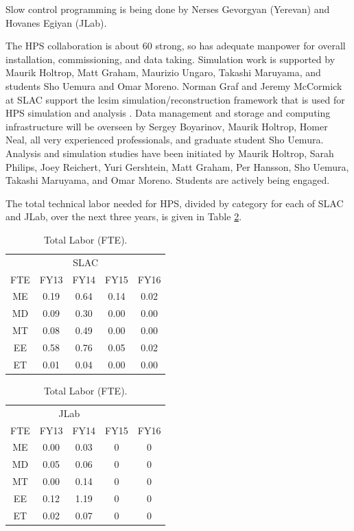 Slow control programming is being done by Nerses Gevorgyan (Yerevan) and Hovanes Egiyan (JLab).

The HPS collaboration is about 60 strong, so has adequate manpower for overall installation, commissioning, and data taking. Simulation work is supported by Maurik Holtrop, 
Matt Graham, Maurizio Ungaro, Takashi Maruyama, and students Sho Uemura and Omar Moreno. Norman Graf and Jeremy McCormick at SLAC support the lcsim 
simulation/reconstruction framework that is used for HPS simulation and analysis . Data management and storage and computing infrastructure will be overseen by 
Sergey Boyarinov, Maurik Holtrop, Homer Neal, all very experienced professionals, and graduate student Sho Uemura. Analysis and simulation studies have been 
initiated by Maurik Holtrop, Sarah Philips, Joey Reichert, Yuri Gershtein, Matt Graham, Per Hansson, Sho Uemura, Takashi Maruyama, and Omar Moreno. 
Students are actively being engaged.

The total technical labor needed for HPS, divided by category for each of SLAC and JLab, over the next three years, is given in Table \ref{tb:engin}.

\begin{table}[htdp]
\caption{Total Labor (FTE).}
\begin{center}
\parbox{.45\linewidth}{
\begin{tabular}{c||cccc}
\multicolumn{5}{c}{SLAC}\\
 FTE	&FY13	&FY14	&FY15&	FY16\\
 \hline\hline
ME	&0.19	&0.64&	0.14&	0.02\\
MD&	0.09	&0.30&	0.00&	0.00\\
MT&	0.08	&0.49&	0.00	&0.00\\
EE &	0.58	&0.76&	0.05	&0.02\\
ET&	0.01	&0.04&	0.00	&0.00\\
\end{tabular}
}
\parbox{.45\linewidth}{
\begin{tabular}{c||cccc}
\multicolumn{4}{c}{JLab}\\
 FTE	&FY13	&FY14	&	FY15&FY16\\
 \hline\hline
ME	&0.00	&0.03&	0&0 \\
MD&	0.05	&0.06&	0 &0\\
MT&	0.00	&0.14& 0&0\\
EE &	0.12	&1.19&0&0\\
ET&	0.02	&0.07&0&0\\
\end{tabular}
}
\end{center}
\label{tb:engin}
\end{table}%

